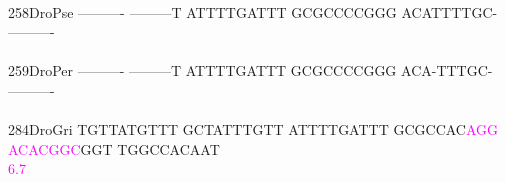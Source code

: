 \documentclass[11pt,twoside,reqno,a4paper]{article}
\begin{document}
{\hspace*{4\charwidth}\hspace*{7\charwidth}\hspace*{1\charwidth}\hspace*{1\charwidth}\hspace*{1\charwidth}\hspace*{1\charwidth}\hspace*{1\charwidth}\hspace*{1\charwidth}\\
258\hspace*{1\charwidth}DroPse	----------	---------T	ATTTTGATTT	GCGCCCCGGG	ACATTTTGC-	----------	\\
\hspace*{4\charwidth}\hspace*{7\charwidth}\hspace*{1\charwidth}\hspace*{1\charwidth}\hspace*{1\charwidth}\hspace*{1\charwidth}\hspace*{1\charwidth}\hspace*{1\charwidth}\\
259\hspace*{1\charwidth}DroPer	----------	---------T	ATTTTGATTT	GCGCCCCGGG	ACA-TTTGC-	----------	\\
\hspace*{4\charwidth}\hspace*{7\charwidth}\hspace*{1\charwidth}\hspace*{1\charwidth}\hspace*{1\charwidth}\hspace*{1\charwidth}\hspace*{1\charwidth}\hspace*{1\charwidth}\\
284\hspace*{1\charwidth}DroGri	TGTTATGTTT	GCTATTTGTT	ATTTTGATTT	GCGCCAC\textcolor{magenta}{A}\textcolor{magenta}{G}\textcolor{magenta}{G}	\textcolor{magenta}{A}\textcolor{magenta}{C}\textcolor{magenta}{A}\textcolor{magenta}{C}\textcolor{magenta}{G}\textcolor{magenta}{G}\textcolor{magenta}{C}GGT	TGGCCACAAT	\\
\hspace*{4\charwidth}\hspace*{7\charwidth}\hspace*{1\charwidth}\hspace*{1\charwidth}\hspace*{1\charwidth}\hspace*{37\charwidth}\textcolor{magenta}{6.7}\hspace*{1\charwidth}\hspace*{1\charwidth}\hspace*{1\charwidth}\\
}
\end{document}
